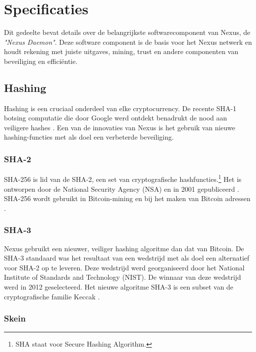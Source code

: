 \documentclass[11pt]{article}
\begin{document}
\section{Specificaties}

Dit gedeelte bevat details over de belangrijkste softwarecomponent van Nexus, de \textit{"Nexus Daemon"}.
Deze software component is de basis voor het Nexus netwerk en houdt rekening met juiste uitgaves, mining, trust en andere componenten van beveiliging en effici\"entie.
 

\subsection{Hashing}

Hashing is een cruciaal onderdeel van elke cryptocurrency. 
De recente SHA-1 botsing computatie die door Google werd ontdekt benadrukt de nood aan veiligere hashes \cite{googlesha1}. 
Een van de innovaties van Nexus is het gebruik van nieuwe hashing-functies met als doel een verbeterde beveiliging.

\subsubsection{SHA-2}

SHA-256 is lid van de SHA-2, een set van cryptografische hashfuncties.\footnote{SHA staat voor Secure Hashing Algorithm.}
Het is ontworpen door de National Security Agency (NSA) en in 2001 gepubliceerd \cite{wikisha2}.
SHA-256 wordt gebruikt in Bitcoin-mining en bij het maken van Bitcoin adressen \cite{bitwiki256}.

\subsubsection{SHA-3}

Nexus gebruikt een nieuwer, veiliger hashing algoritme dan dat van Bitcoin. 
De SHA-3 \cite{sha3} standaard was het resultaat van een wedstrijd \cite{nistcompetitionend} met als doel een alternatief voor SHA-2 op te leveren. Deze wedstrijd werd georganiseerd door het National Institute of Standards and Technology (NIST). 
De winnaar van deze wedstrijd werd in 2012 geselecteerd. 
Het nieuwe algoritme SHA-3 is een subset van de cryptografische familie Keccak \cite{nistgovk}.

\subsubsection{Skein}
\end{document}
